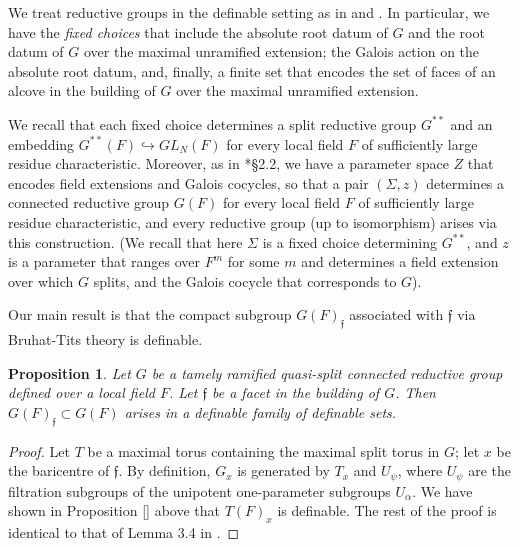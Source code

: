 \documentclass{amsart}
\newcommand{\ff}{{\mathfrak f}}
\theoremstyle{plain}
\newtheorem{prop}[thm]{Proposition}
\theoremstyle{definition}
\begin{document}
We treat reductive groups in the definable setting as in \cite{hales:transfert} and \cite{CGH-2}.
In particular, we have the \emph{fixed choices} that include the absolute root datum of $G$ and the root datum of $G$ over the maximal unramified extension; the Galois action on the absolute root datum, and, finally,  a finite set that encodes the set of faces of an alcove in the building of $G$ over the maximal unramified extension.

We recall that each  fixed choice determines  a split reductive group $G^{\ast\ast}$ and an embedding 
$G^{\ast\ast}(F)\hookrightarrow GL_N(F)$ for every local field $F$ of sufficiently large residue characteristic.  
Moreover, as in \cite{hales:transfert}*{\S 2.2}, we  have a parameter space $Z$ that encodes field extensions and Galois cocycles, so that a pair 
$(\Sigma, z)$ determines a connected reductive group $G(F)$ for every local field $F$ of sufficiently large residue characteristic, and every reductive group (up to isomorphism)  arises via this construction. 
(We recall that here $\Sigma$ is a fixed choice determining $G^{\ast\ast}$, and $z$ is a parameter that ranges over $F^m$ for some $m$ and determines a field extension over which $G$ splits, and the Galois cocycle that corresponds to $G$). 

Our main result is that 
the compact subgroup $G(F)_\ff$ associated with $\ff$ via Bruhat-Tits theory is definable.  


\begin{prop} Let $G$ be a tamely ramified quasi-split connected reductive group defined over a local field $F$. Let $\ff$ be a facet in the building of $G$. 
Then $G(F)_\ff\subset G(F)$ arises in a definable family of definable sets. 
\end{prop}

\begin{proof} Let $T$ be a maximal torus containing the maximal split torus in $G$; let $x$ be the baricentre of $\ff$.
By definition, $G_x$ is generated by $T_x$ and $U_\psi$, where $U_\psi$ are the filtration subgroups of the unipotent one-parameter subgroups $U_{\alpha}$. 
We have shown in Proposition \ref{} above that  $T(F)_x$ is definable. The rest of the proof is identical to that of Lemma 3.4 in \cite{CGH-2}.  
\end{proof} 

\begin{bibdiv}
\begin{biblist}
\end{biblist}
\end{bibdiv}
\end{document}
